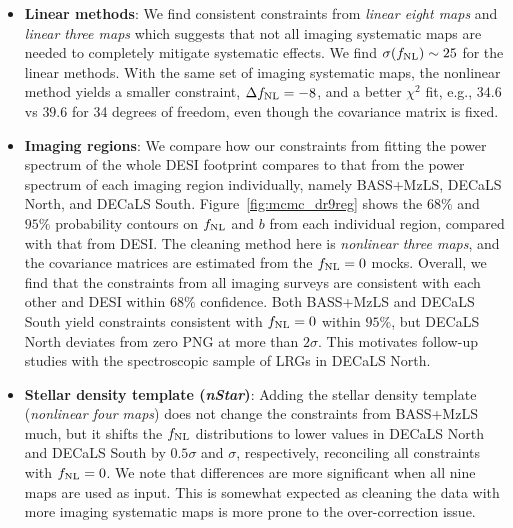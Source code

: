 \begin{itemize}[itemindent=*]

\item \textbf{Linear methods}: We find consistent constraints from \textit{linear eight maps} and \textit{linear three maps} which suggests that not all imaging systematic maps are needed to completely mitigate systematic effects. We find $\sigma (f_{\rm NL}) \sim 25$ for the linear methods. With the same set of imaging systematic maps, the nonlinear method yields a smaller constraint, $\Delta f_{\rm NL} = -8$, and a better $\chi^{2}$ fit, e.g., $34.6$ vs $39.6$ for 34 degrees of freedom, even though the covariance matrix is fixed.

\item \textbf{Imaging regions}: We compare how our constraints from fitting the power spectrum of the whole DESI footprint compares to that from the power spectrum of each imaging region individually, namely BASS+MzLS, DECaLS North, and DECaLS South. Figure~\ref{fig:mcmc_dr9reg} shows the $68\%$ and $95\%$ probability contours on $f_{\rm NL}$ and $b$ from each individual region, compared with that from DESI. The cleaning method here is \textit{nonlinear three maps}, and the covariance matrices are estimated from the $f_{\rm NL}=0$ mocks. Overall, we find that the constraints from all imaging surveys are consistent with each other and DESI within $68\%$ confidence. Both BASS+MzLS and DECaLS South yield constraints consistent with $f_{\rm NL}=0$ within $95\%$, but DECaLS North deviates from zero PNG at more than $2\sigma$. This motivates follow-up studies with the spectroscopic sample of LRGs in DECaLS North.

\item \textbf{Stellar density template (\textit{nStar})}: Adding the stellar density template (\textit{nonlinear four maps}) does not change the constraints from BASS+MzLS much, but it shifts the $f_{\rm NL}$ distributions to lower values in DECaLS North and DECaLS South by $0.5\sigma$ and $\sigma$, respectively, reconciling all constraints with $f_{\rm NL}=0$. We note that differences are more significant when all nine maps are used as input. This is somewhat expected as cleaning the data with more imaging systematic maps is more prone to the over-correction issue.  


\end{itemize}
